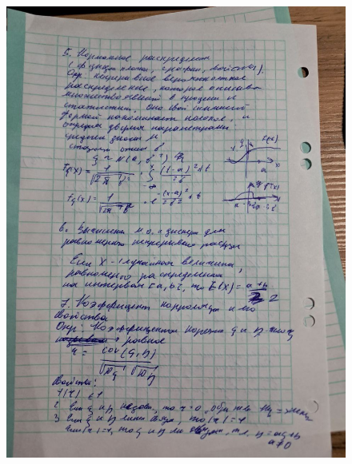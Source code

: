 \documentclass{article}
\begin{document}
\begin{figure}[H]
    \centering
    \includegraphics[width=1\linewidth]{photo_5323477539961828013_y.jpg}
\end{figure}
\end{document}
